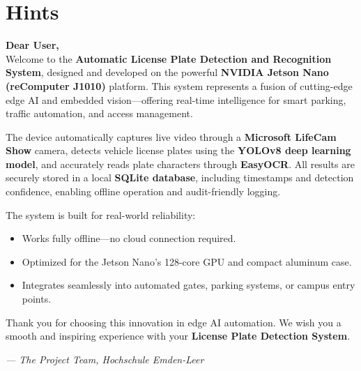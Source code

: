 %
%
%



\chapter{Hints}

\begin{tcolorbox}[colback=blue!5!white,
	colframe=blue!60!black,
	title={\faHandshake\hspace{0.5em}Welcome to Your Smart License Detection System},
	fonttitle=\bfseries\large,
	arc=3mm,
	boxrule=1pt]
	
	\noindent
	\textbf{Dear User,}\\[4pt]
	Welcome to the \textbf{Automatic License Plate Detection and Recognition System}, designed and developed on the powerful \textbf{NVIDIA Jetson Nano (reComputer J1010)} platform.  
	This system represents a fusion of cutting-edge edge AI and embedded vision—offering real-time intelligence for smart parking, traffic automation, and access management.
	
	\vspace{0.5em}
	The device automatically captures live video through a \textbf{Microsoft LifeCam Show} camera, detects vehicle license plates using the \textbf{YOLOv8 deep learning model}, and accurately reads plate characters through \textbf{EasyOCR}.  
	All results are securely stored in a local \textbf{SQLite database}, including timestamps and detection confidence, enabling offline operation and audit-friendly logging.
	
	\vspace{0.5em}
	The system is built for real-world reliability:
	\begin{itemize}
		\item Works fully offline—no cloud connection required.
		\item Optimized for the Jetson Nano’s 128-core GPU and compact aluminum case.
		\item Integrates seamlessly into automated gates, parking systems, or campus entry points.
	\end{itemize}
	
	\vspace{0.5em}
	\noindent
	Thank you for choosing this innovation in edge AI automation.  
	We wish you a smooth and inspiring experience with your \textbf{License Plate Detection System}.
	
	\vspace{0.3cm}
	\noindent
	\textit{— The Project Team, Hochschule Emden-Leer}
\end{tcolorbox}

